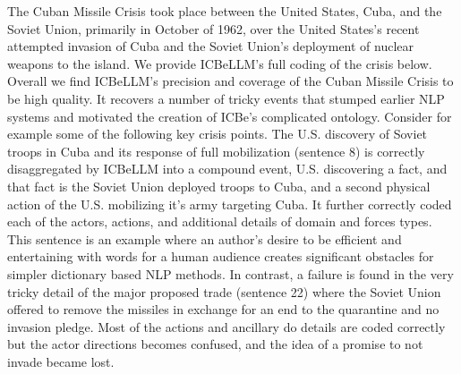 \documentclass[
]{article}
\begin{document}
The Cuban Missile Crisis took place between the United States, Cuba, and
the Soviet Union, primarily in October of 1962, over the United States's
recent attempted invasion of Cuba and the Soviet Union's deployment of
nuclear weapons to the island. We provide ICBeLLM's full coding of the
crisis below. Overall we find ICBeLLM's precision and coverage of the
Cuban Missile Crisis to be high quality. It recovers a number of tricky
events that stumped earlier NLP systems and motivated the creation of
ICBe's complicated ontology. Consider for example some of the following
key crisis points. The U.S. discovery of Soviet troops in Cuba and its
response of full mobilization (sentence 8) is correctly disaggregated by
ICBeLLM into a compound event, U.S. discovering a fact, and that fact is
the Soviet Union deployed troops to Cuba, and a second physical action
of the U.S. mobilizing it's army targeting Cuba. It further correctly
coded each of the actors, actions, and additional details of domain and
forces types. This sentence is an example where an author's desire to be
efficient and entertaining with words for a human audience creates
significant obstacles for simpler dictionary based NLP methods. In
contrast, a failure is found in the very tricky detail of the major
proposed trade (sentence 22) where the Soviet Union offered to remove
the missiles in exchange for an end to the quarantine and no invasion
pledge. Most of the actions and ancillary do details are coded correctly
but the actor directions becomes confused, and the idea of a promise to
not invade became lost.

\newpage{}
\end{document}

